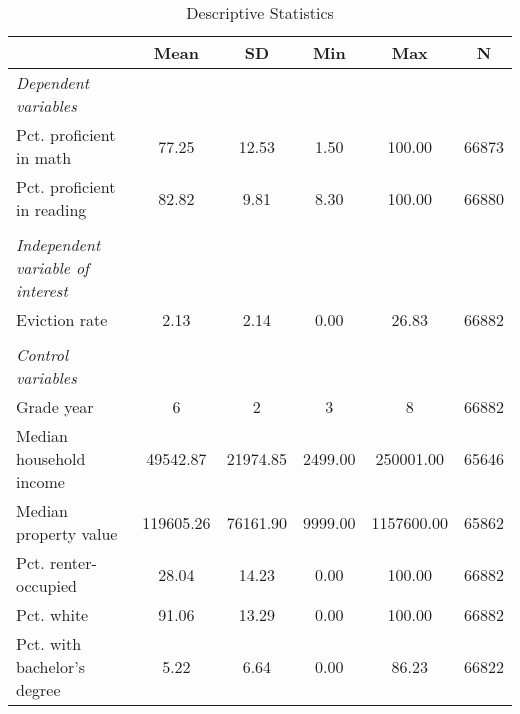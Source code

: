 \begin{table}[htbp]\centering
\def\sym#1{\ifmmode^{#1}\else\(^{#1}\)\fi}
\caption{Descriptive Statistics}
\begin{tabular}{l*{1}{ccccc}}
\toprule
                    &        Mean&          SD&         Min&         Max&           N\\
\midrule
\emph{Dependent variables}&            &            &            &            &            \\
\hspace{0.25cm} Pct. proficient in math&       77.25&       12.53&        1.50&      100.00&       66873\\
\hspace{0.25cm} Pct. proficient in reading&       82.82&        9.81&        8.30&      100.00&       66880\\
\vspace{0.1em} \\ \emph{Independent variable of interest}&            &            &            &            &            \\
\hspace{0.25cm} Eviction rate&        2.13&        2.14&        0.00&       26.83&       66882\\
\vspace{0.1em} \\ \emph{Control variables}&            &            &            &            &            \\
\hspace{0.25cm} Grade year&           6&           2&           3&           8&       66882\\
\hspace{0.25cm} Median household income&    49542.87&    21974.85&     2499.00&   250001.00&       65646\\
\hspace{0.25cm} Median property value&   119605.26&    76161.90&     9999.00&  1157600.00&       65862\\
\hspace{0.25cm} Pct. renter-occupied&       28.04&       14.23&        0.00&      100.00&       66882\\
\hspace{0.25cm} Pct. white&       91.06&       13.29&        0.00&      100.00&       66882\\
\hspace{0.25cm} Pct. with bachelor's degree&        5.22&        6.64&        0.00&       86.23&       66822\\

\end{tabular}
\end{table}
